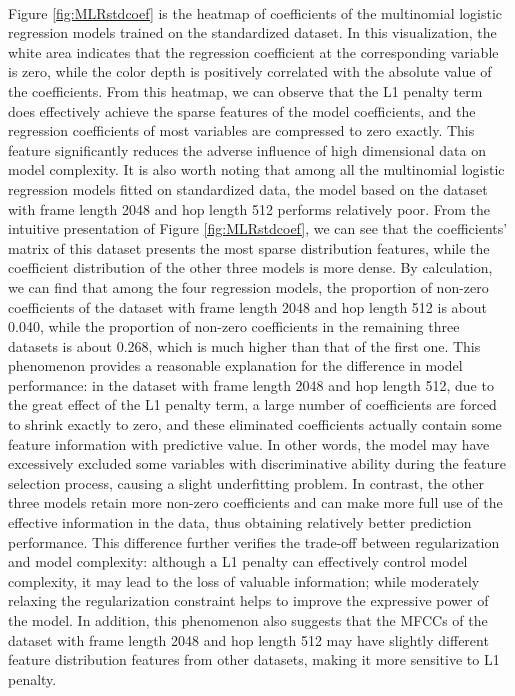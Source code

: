 \\
Figure \ref{fig:MLRstdcoef} is the heatmap of coefficients of the multinomial logistic regression models trained on the standardized dataset. In this visualization, the white area indicates that the regression coefficient at the corresponding variable is zero, while the color depth is positively correlated with the absolute value of the coefficients. From this heatmap, we can observe that the L1 penalty term does effectively achieve the sparse features of the model coefficients, and the regression coefficients of most variables are compressed to zero exactly. This feature significantly reduces the adverse influence of high dimensional data on model complexity. It is also worth noting that among all the multinomial logistic regression models fitted on standardized data, the model based on the dataset with frame length 2048 and hop length 512 performs relatively poor. From the intuitive presentation of Figure \ref{fig:MLRstdcoef}, we can see that the coefficients' matrix of this dataset presents the most sparse distribution features, while the coefficient distribution of the other three models is more dense. By calculation, we can find that among the four regression models, the proportion of non-zero coefficients of the dataset with frame length 2048 and hop length 512 is about 0.040, while the proportion of non-zero coefficients in the remaining three datasets is about 0.268, which is much higher than that of the first one. This phenomenon provides a reasonable explanation for the difference in model performance: in the dataset with frame length 2048 and hop length 512, due to the great effect of the L1 penalty term, a large number of coefficients are forced to shrink exactly to zero, and these eliminated coefficients actually contain some feature information with predictive value. In other words, the model may have excessively excluded some variables with discriminative ability during the feature selection process, causing a slight underfitting problem. In contrast, the other three models retain more non-zero coefficients and can make more full use of the effective information in the data, thus obtaining relatively better prediction performance. This difference further verifies the trade-off between regularization and model complexity: although a L1 penalty can effectively control model complexity, it may lead to the loss of valuable information; while moderately relaxing the regularization constraint helps to improve the expressive power of the model. In addition, this phenomenon also suggests that the MFCCs of the dataset with frame length 2048 and hop length 512 may have slightly different feature distribution features from other datasets, making it more sensitive to L1 penalty. \\

